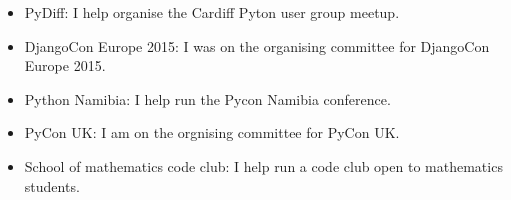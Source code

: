 \documentclass[10pt]{res} %
\begin{document}
\begin{resume}
\begin{itemize}
    \item PyDiff: I help organise the Cardiff Pyton user group meetup.

    \item DjangoCon Europe 2015: I was on the organising committee for DjangoCon Europe 2015.

    \item Python Namibia: I help run the Pycon Namibia conference.

    \item PyCon UK: I am on the orgnising committee for PyCon UK.

    \item School of mathematics code club: I help run a code club open to mathematics students.

\end{itemize}

\end{resume}
\end{document}
